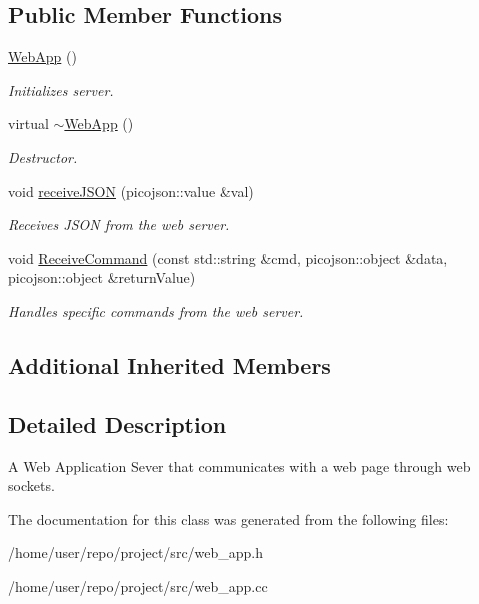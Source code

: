 \subsection*{Public Member Functions}
\begin{DoxyCompactItemize}
\item 
\mbox{\label{classWebApp_a9ba424099f42bdd456f52c4bba87d5b2}} 
\hyperlink{classWebApp_a9ba424099f42bdd456f52c4bba87d5b2}{Web\+App} ()
\begin{DoxyCompactList}\small\item\em Initializes server. \end{DoxyCompactList}\item 
\mbox{\label{classWebApp_ad73fb17d2f4176bb002a8e6df6346ef9}} 
virtual \hyperlink{classWebApp_ad73fb17d2f4176bb002a8e6df6346ef9}{$\sim$\+Web\+App} ()
\begin{DoxyCompactList}\small\item\em Destructor. \end{DoxyCompactList}\item 
\mbox{\label{classWebApp_a0af5cfc12444f53e48609360eff95d76}} 
void \hyperlink{classWebApp_a0af5cfc12444f53e48609360eff95d76}{receive\+J\+S\+ON} (picojson\+::value \&val)
\begin{DoxyCompactList}\small\item\em Receives J\+S\+ON from the web server. \end{DoxyCompactList}\item 
\mbox{\label{classWebApp_ac1ae360aa44aeb9f2bccb53f6d7881b4}} 
void \hyperlink{classWebApp_ac1ae360aa44aeb9f2bccb53f6d7881b4}{Receive\+Command} (const std\+::string \&cmd, picojson\+::object \&data, picojson\+::object \&return\+Value)
\begin{DoxyCompactList}\small\item\em Handles specific commands from the web server. \end{DoxyCompactList}\end{DoxyCompactItemize}
\subsection*{Additional Inherited Members}


\subsection{Detailed Description}
A Web Application Sever that communicates with a web page through web sockets. 

The documentation for this class was generated from the following files\+:\begin{DoxyCompactItemize}
\item 
/home/user/repo/project/src/web\+\_\+app.\+h\item 
/home/user/repo/project/src/web\+\_\+app.\+cc\end{DoxyCompactItemize}
